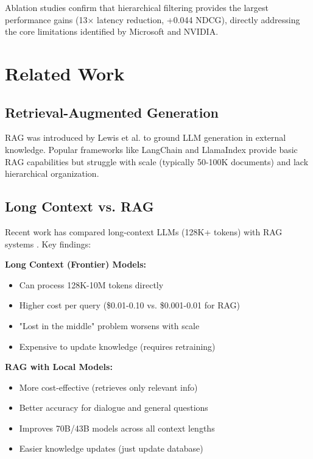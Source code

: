 \documentclass[11pt]{article}
\begin{document}
Ablation studies confirm that hierarchical filtering provides the largest performance gains (13× latency reduction, +0.044 NDCG), directly addressing the core limitations identified by Microsoft and NVIDIA.

\section{Related Work}

\subsection{Retrieval-Augmented Generation}

RAG was introduced by Lewis et al. \cite{lewis2020retrieval} to ground LLM generation in external knowledge. Popular frameworks like LangChain \cite{langchain2023} and LlamaIndex \cite{llamaindex2023} provide basic RAG capabilities but struggle with scale (typically 50-100K documents) and lack hierarchical organization.

\subsection{Long Context vs. RAG}

Recent work has compared long-context LLMs (128K+ tokens) with RAG systems \cite{arxiv2024longcontext}. Key findings:

\textbf{Long Context (Frontier) Models:}
\begin{itemize}
    \item Can process 128K-10M tokens directly
    \item Higher cost per query (\$0.01-0.10 vs. \$0.001-0.01 for RAG)
    \item "Lost in the middle" problem worsens with scale \cite{liu2023lost}
    \item Expensive to update knowledge (requires retraining)
\end{itemize}

\textbf{RAG with Local Models:}
\begin{itemize}
    \item More cost-effective (retrieves only relevant info)
    \item Better accuracy for dialogue and general questions
    \item Improves 70B/43B models across all context lengths
    \item Easier knowledge updates (just update database)
\end{itemize}
\end{document}

